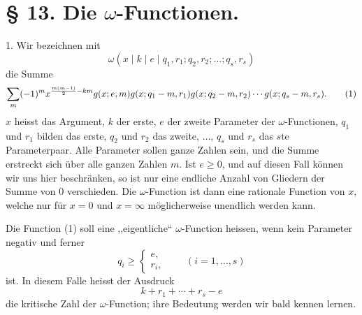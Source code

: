\documentclass[11pt,a4paper]{article}
\begin{document}
\section*{§ 13. Die $\omega$-Functionen.}

1. Wir bezeichnen mit
\[
 \omega(x\mid k\mid e\mid q_1,r_1;q_2,r_2;\ldots;q_s,r_s)
\]
die Summe
\begin{equation}
 \sum_m(-1)^m x^{{m(m-1)\over2}-km}
 g(x;e,m)g(x;q_1-m,r_1)g(x;q_2-m,r_2)\cdots g(x;q_s-m,r_s).
\tag{1}
\end{equation}
$x$ heisst das Argument, $k$ der erste, $e$ der zweite Parameter der $\omega$-Functionen, $q_1$ und $r_1$ bilden das erste, $q_2$ und $r_2$ das zweite, $\ldots$, $q_s$ und $r_s$ das $s$te Parameterpaar. Alle Parameter sollen ganze Zahlen sein, und die Summe erstreckt sich über alle ganzen Zahlen $m$. Ist $e\ge0$, und auf diesen Fall können wir uns hier beschränken, so ist nur eine endliche Anzahl von Gliedern der Summe von 0 verschieden. Die $\omega$-Function ist dann eine rationale Function von $x$, welche nur für $x=0$ und $x=\infty$ möglicherweise unendlich werden kann.

Die Function (1) soll eine ,,eigentliche`` $\omega$-Function heissen, wenn kein Parameter negativ und ferner
\[
 q_i\ge \begin{cases}e,\\ r_i,
 \end{cases}\qquad(i=1,\ldots,s)
\]
ist. In diesem Falle heisst der Ausdruck
\[
 k+r_1+\cdots+r_s-e
\]
die kritische Zahl der $\omega$-Function; ihre Bedeutung werden wir bald kennen lernen.
\end{document}
